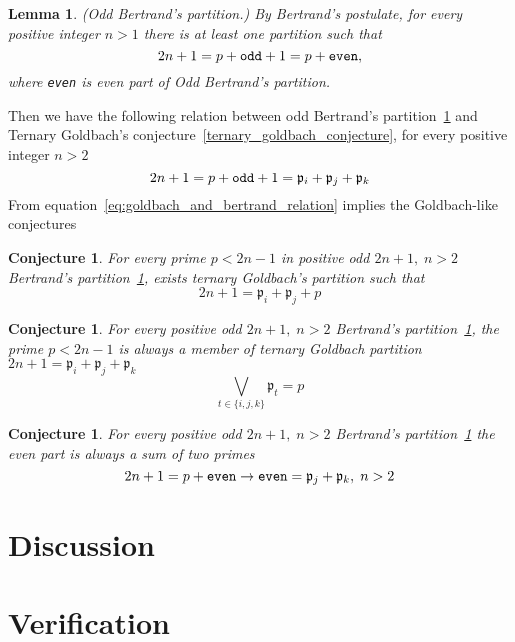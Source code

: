 \documentclass[12pt,letterpaper,oneside,reqno]{amsart}
\newtheorem{lem}{Lemma}[section]
\newtheorem{conj}[thm]{Conjecture}
\begin{document}
    \begin{lem}(Odd Bertrand's partition.)
        \label{bertrands_odd_partition_lemma}
        By Bertrand's postulate, for every positive integer $n>1$ there is at least one partition such that
        \[
            2n + 1 = p + \verb!odd! + 1 = p + \verb!even!,
        \]
        where \verb!even! is even part of Odd Bertrand's partition.
    \end{lem}
    Then we have the following relation between odd Bertrand's partition~\ref{bertrands_odd_partition_lemma} and
    Ternary Goldbach's conjecture~\ref{ternary_goldbach_conjecture}, for every positive integer $n>2$
    \begin{equation}
        2n + 1 = p + \verb!odd! + 1 = \mathfrak{p}_i +  \mathfrak{p}_j + \mathfrak{p}_k
        \label{eq:goldbach_and_bertrand_relation}
    \end{equation}
    From equation~\eqref{eq:goldbach_and_bertrand_relation} implies the Goldbach-like conjectures
    \begin{conj}
        For every prime $p< 2n-1$ in positive odd $2n+1, \; n>2$ Bertrand's partition~\ref{bertrands_odd_partition_lemma},
        exists ternary Goldbach's partition such that
        \[
            2n+1 = \mathfrak{p}_i +  \mathfrak{p}_j + p
        \]
    \end{conj}
    \begin{conj}
        For every positive odd $2n+1, \; n>2$ Bertrand's partition~\ref{bertrands_odd_partition_lemma},
        the prime $p < 2n-1$ is always a member of ternary Goldbach partition
        $2n+1 =\mathfrak{p}_i +  \mathfrak{p}_j + \mathfrak{p}_k$
        \[
            \bigvee_{t \in \{i, j, k\}} \mathfrak{p}_t = p
        \]
    \end{conj}
    \begin{conj}
        For every positive odd $2n+1, \; n>2$ Bertrand's partition~\ref{bertrands_odd_partition_lemma}
        the even part is always a sum of two primes
        \[
            2n + 1 = p + \verb!even! \rightarrow \verb!even! = \mathfrak{p}_j + \mathfrak{p}_k, \; n > 2
        \]
    \end{conj}


    \section{Discussion}\label{sec:discussion}
    \section{Verification}\label{sec:verification}
    
    
\end{document}
